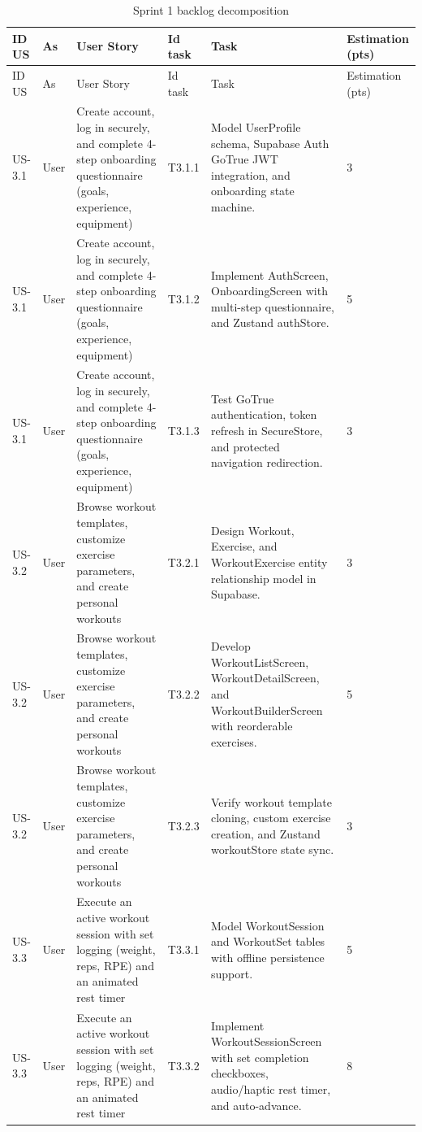 \documentclass[12pt,a4paper,openany]{report}
\begin{document}
\begingroup
\scriptsize
\setlength{\tabcolsep}{3pt}
\renewcommand{\arraystretch}{1.20}
\setlength{\LTpre}{5pt}
\setlength{\LTpost}{10pt}
\begin{longtable}{|L{1.00cm}|L{0.95cm}|L{4.80cm}|L{1.20cm}|L{6.20cm}|L{1.60cm}|}
\caption{Sprint 1 backlog decomposition}\label{tab:pdf-29-16} \\
\hline
{}
ID US & As & User Story & Id task & Task & Estimation (pts) \\ \hline
\endfirsthead
\hline
{}
ID US & As & User Story & Id task & Task & Estimation (pts) \\ \hline
\endhead
US-3.1 & User & Create account, log in securely, and complete 4-step onboarding questionnaire (goals, experience, equipment) & T3.1.1 & Model UserProfile schema, Supabase Auth GoTrue JWT integration, and onboarding state machine. & 3 \\ \hline
US-3.1 & User & Create account, log in securely, and complete 4-step onboarding questionnaire (goals, experience, equipment) & T3.1.2 & Implement AuthScreen, OnboardingScreen with multi-step questionnaire, and Zustand authStore. & 5 \\ \hline
US-3.1 & User & Create account, log in securely, and complete 4-step onboarding questionnaire (goals, experience, equipment) & T3.1.3 & Test GoTrue authentication, token refresh in SecureStore, and protected navigation redirection. & 3 \\ \hline
US-3.2 & User & Browse workout templates, customize exercise parameters, and create personal workouts & T3.2.1 & Design Workout, Exercise, and WorkoutExercise entity relationship model in Supabase. & 3 \\ \hline
US-3.2 & User & Browse workout templates, customize exercise parameters, and create personal workouts & T3.2.2 & Develop WorkoutListScreen, WorkoutDetailScreen, and WorkoutBuilderScreen with reorderable exercises. & 5 \\ \hline
US-3.2 & User & Browse workout templates, customize exercise parameters, and create personal workouts & T3.2.3 & Verify workout template cloning, custom exercise creation, and Zustand workoutStore state sync. & 3 \\ \hline
US-3.3 & User & Execute an active workout session with set logging (weight, reps, RPE) and an animated rest timer & T3.3.1 & Model WorkoutSession and WorkoutSet tables with offline persistence support. & 5 \\ \hline
US-3.3 & User & Execute an active workout session with set logging (weight, reps, RPE) and an animated rest timer & T3.3.2 & Implement WorkoutSessionScreen with set completion checkboxes, audio/haptic rest timer, and auto-advance. & 8 \\ \hline

\end{longtable}
\end{document}
